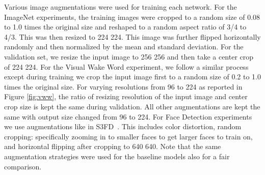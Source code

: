 \documentclass[10pt]{article}
\begin{document}
Various image augmentations were used for training each network. For
the ImageNet experiments, the training images were cropped to a random
size of 0.08 to 1.0 times the original size and reshaped to a random
aspect ratio of 3/4 to 4/3. This was then resized to 224 
224. This image was further flipped horizontally randomly and then
normalized by the mean and standard deviation. For the validation set, we
resize the input image to 256  256 and then take a center crop
of 224  224. For the Visual Wake Word experiment, we follow a
similar process except during training we crop the input image first
to a random size of 0.2 to 1.0 times the original size. For varying
resolutions from 96 to 224 as reported in Figure \ref{fig:vww}, the
ratio of resizing resolution of the input image and center crop size is kept
the same during validation. All other augmentations are kept the same with
output size changed from 96 to 224. For Face Detection experiments we
use augmentations like in S3FD~\citep{zhang2017s3fd}. This includes
color distortion, random cropping: specifically zooming in to
smaller faces to get larger faces to train on, and horizontal
flipping after cropping to 640  640. Note that the same
augmentation strategies were used for the baseline models also for
a fair comparison.
\end{document}
